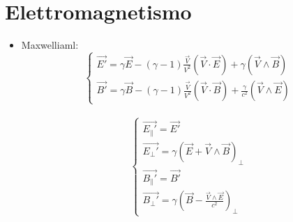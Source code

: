\documentclass[a4paper]{article}
\begin{document}
    \section{Elettromagnetismo}
        \begin{itemize}
            \item Maxwelliaml:\\
                $$\begin{cases}
                    \vec{E'}=\gamma\vec{E}-(\gamma-1)\frac{\vec{V}}{V^2}(\vec{V}\cdot\vec{E})+\gamma(\vec{V}\wedge\vec{B})\\
                    \vec{B'}=\gamma\vec{B}-(\gamma-1)\frac{\vec{V}}{V^2}(\vec{V}\cdot\vec{B})+\frac{\gamma}{c^2}(\vec{V}\wedge\vec{E})
                \end{cases}$$\\
                $$\begin{cases}
                    \vec{E_\|'}=\vec{E'}\\
                    \vec{E_\perp'}=\gamma(\vec{E}+\vec{V}\wedge\vec{B})_\perp\\
                    \vec{B_\|'}=\vec{B'}\\
                    \vec{B_\perp'}=\gamma(\vec{B}-\frac{\vec{V}\wedge\vec{E}}{c^2})_\perp
                \end{cases}$$
        \end{itemize}
	
\end{document}
